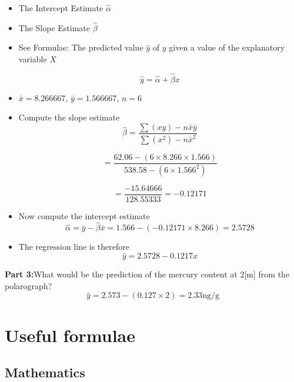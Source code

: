 \begin{itemize}
	
	\item The Intercept Estimate $\hat{\alpha}$
	
	\item The Slope Estimate $\hat{\beta}$
	
	\item See Formulae: The predicted value $\hat{y} $ of $y$ given a value of the explanatory variable $X$
	
	\[\hat{y} = \hat{\alpha} + \hat{\beta}x \]
	
	
	
	\item  $\bar{x} = 8.266667$, $\bar{y} = 1.566667$, $n =6$
	
	\item Compute the slope estimate
	\[\hat{\beta} =  \frac{\sum(xy) - n\bar{x} \bar{y} }{\sum(x^2) - n\bar{x}^2 }\]
	
	\[= \frac{62.06 - (6 \times 8.266 \times 1.566) }{538.58  - (6 \times 1.566^2) }\]
	
	\[= \frac{-15.64666}{128.55333} = -0.12171\]
	
	
	\item Now compute the intercept estimate \[ \hat{\alpha} = \bar{y} - \hat{\beta}\bar{x} = 1.566-(-0.12171 \times 8.266) = 2.5728\]
	\item The regression line is therefore \[\hat{y} = 2.5728 - 0.1217x \]
\end{itemize}




\noindent\textbf{Part 3:}What would be the prediction of the mercury content at 2[m] from the polarograph?
\bigskip
\[ \hat{y} = 2.573 - (0.127 \times 2) = 2.33 \mbox{ng/g}  \]








\section{Useful formulae}

\subsection{Mathematics}

